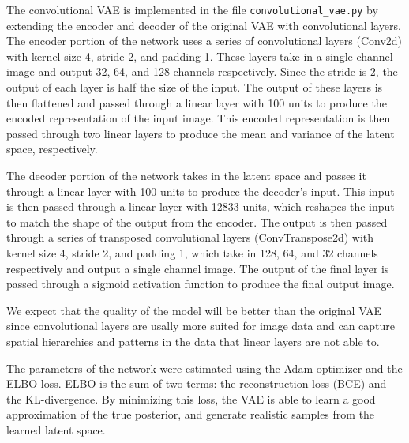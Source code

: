 The convolutional VAE is implemented in the file \texttt{convolutional\_vae.py} by extending the encoder and decoder of the original VAE with convolutional layers. The encoder portion of the network uses a series of convolutional layers (Conv2d) with kernel size 4, stride 2, and padding 1. These layers take in a single channel image and output 32, 64, and 128 channels respectively. Since the stride is 2, the output of each layer is half the size of the input. The output of these layers is then flattened and passed through a linear layer with 100 units to produce the encoded representation of the input image. This encoded representation is then passed through two linear layers to produce the mean and variance of the latent space, respectively.

The decoder portion of the network takes in the latent space and passes it through a linear layer with 100 units to produce the decoder's input. This input is then passed through a linear layer with 12833 units, which reshapes the input to match the shape of the output from the encoder. The output is then passed through a series of transposed convolutional layers (ConvTranspose2d) with kernel size 4, stride 2, and padding 1, which take in 128, 64, and 32 channels respectively and output a single channel image. The output of the final layer is passed through a sigmoid activation function to produce the final output image.

We expect that the quality of the model will be better than the original VAE since convolutional layers are usally more suited for image data and can capture spatial hierarchies and patterns in the data that linear layers are not able to.

The parameters of the network were estimated using the Adam optimizer and the ELBO loss. ELBO is the sum of two terms: the reconstruction loss (BCE) and the KL-divergence. By minimizing this loss, the VAE is able to learn a good approximation of the true posterior, and generate realistic samples from the learned latent space. 


















